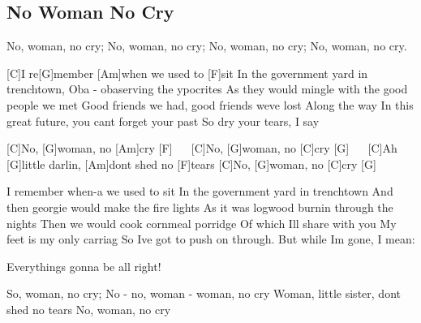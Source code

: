\subsection*{No Woman No Cry   }



\begin{guitar}


No, woman, no cry;
No, woman, no cry;
No, woman, no cry;
No, woman, no cry.


[C]I re[G]member [Am]when we used to [F]sit
In the government yard in trenchtown,
Oba - obaserving the ypocrites
As they would mingle with the good people we met
Good friends we had, good friends weve lost
Along the way
In this great future, you cant forget your past
So dry your tears, I say


[C]No, [G]woman, no [Am]cry [F] $\quad$
[C]No, [G]woman, no [C]cry [G] $\quad$
[C]Ah [G]little darlin, [Am]dont shed no [F]tears
[C]No, [G]woman, no [C]cry [G] $\quad$


I remember when-a we used to sit
In the government yard in trenchtown
And then georgie would make the fire lights
As it was logwood burnin through the nights
Then we would cook cornmeal porridge
Of which Ill share with you
My feet is my only carriag
So Ive got to push on through.
But while Im gone, I mean:


Everythings gonna be all right!


So, woman, no cry;
No - no, woman - woman, no cry
Woman, little sister, dont shed no tears
No, woman, no cry
\end{guitar}
